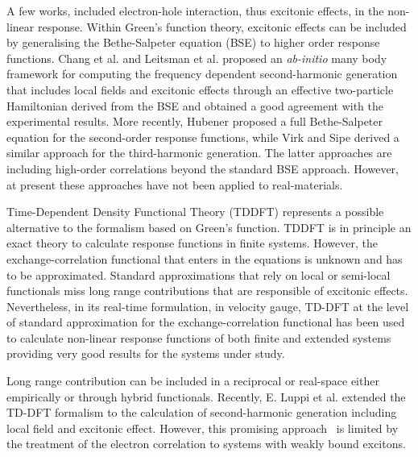 A few works, included electron-hole interaction, thus excitonic effects, in the non-linear response. Within Green's function theory, excitonic effects can be included by generalising the Bethe-Salpeter equation (BSE)\cite{strinati} to higher order response functions. Chang et al.\cite{Chang2002} and Leitsman et al.\cite{Leitsmann2005} proposed an \emph{ab-initio} many body framework for computing the frequency dependent second-harmonic generation that includes local fields and excitonic effects through an effective two-particle Hamiltonian derived from the BSE and obtained a good agreement with the experimental results.
More recently, Hubener\cite{PhysRevA.83.062122} proposed a full Bethe-Salpeter equation for the second-order response functions, while Virk and Sipe derived a similar approach for the third-harmonic generation.\cite{PhysRevB.80.165318}
The latter approaches are including high-order correlations beyond the standard BSE approach. However, at present these approaches have not been applied to real-materials. %

Time-Dependent Density Functional Theory (TDDFT)\cite{PhysRevLett.52.997} represents a possible alternative to the formalism based on Green's function. TDDFT is in principle an exact theory to calculate response functions in finite systems. However, the exchange-correlation functional that enters in the equations is unknown and has to be approximated. Standard approximations that rely on local or semi-local functionals miss long range contributions that are responsible of excitonic effects\cite{botti2007time}. Nevertheless, in its real-time formulation, in velocity gauge, TD-DFT at the level of standard approximation for the  exchange-correlation functional has been used to calculate non-linear response functions of both finite and extended systems providing very good results for the systems under study.\cite{takimoto:154114,andrade2007time} %

Long range contribution can be included in a reciprocal or real-space either empirically or through  hybrid functionals.\cite{botti2007time} Recently, E. Luppi et al. extended the TD-DFT formalism to the calculation of second-harmonic generation including local field and excitonic effect.\cite{PhysRevB.82.235201} %
However, this promising approach~\cite{Cazzanelli2012} is limited by the treatment of the electron correlation to systems with weakly bound excitons.~\cite{LRC}

